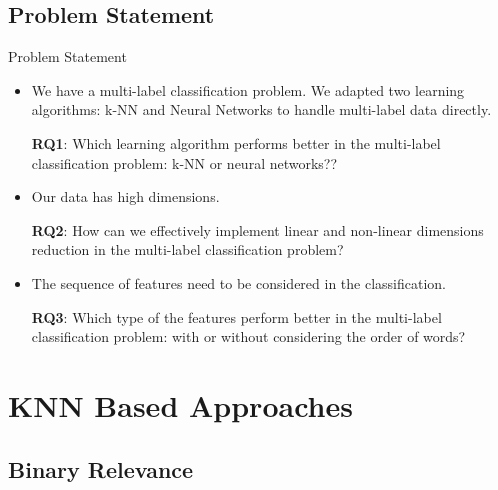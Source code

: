 \documentclass{beamer}
\begin{document}
\subsection{Problem Statement}

\begin{frame}[t]{Problem Statement}
    \small
    \begin{itemize}
        \item 
        We have a multi-label classification problem. We adapted two learning algorithms: k-NN and Neural Networks to handle multi-label data directly.
        
        \textbf{RQ1}: Which learning algorithm performs better in the multi-label classification problem: k-NN or neural networks?? 
        
        \item
        Our data has high dimensions.
        
        \textbf{RQ2}: How can we effectively implement linear and non-linear dimensions reduction in the multi-label classification problem?
        
        \item
        The sequence of features need to be considered in the classification.
        
        \textbf{RQ3}: Which type of the features perform better in the multi-label classification problem: with or without considering the order of words?
        
    \end{itemize}
    
\end{frame}

\section{KNN Based Approaches}

\subsection{Binary Relevance}
\end{document}
